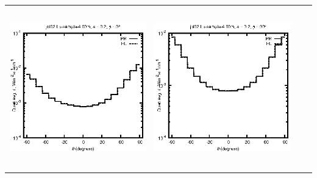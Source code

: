 \begin{tabular}{c c c c}
\includegraphics[height=7cm]{../eps/jol02_Lu_sample_4.00m_fwd.eps} &
\includegraphics[height=7cm]{../eps/jol02_Lu_sample_4.00m_cross.eps} \\
\end{tabular}

\pagebreak

